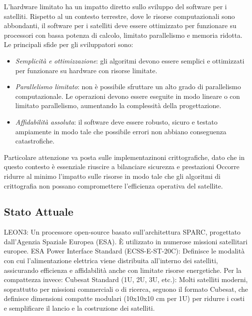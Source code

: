 \noindent
L'hardware limitato ha un impatto diretto sullo sviluppo del software per i satelliti. 
Rispetto al un contesto terrestre, dove le risorse computazionali sono abbondanti, il software per i satelliti deve essere ottimizzato per funzionare su processori con bassa potenza di calcolo, limitato parallelismo e memoria ridotta. 
Le principali sfide per gli sviluppatori sono:

\begin{itemize}
    \item \textit{Semplicità e ottimizzazione}: gli algoritmi devono essere semplici e ottimizzati per funzionare su hardware con risorse limitate.
    \item \textit{Parallelismo limitato}: non è possibile sfruttare un alto grado di parallelismo computazionale. Le operazioni devono essere eseguite in modo lineare o con limitato parallelismo, aumentando la complessità della progettazione.
    \item \textit{Affidabilità assoluta}: il software deve essere robusto, sicuro e testato ampiamente in modo tale che possibile errori non abbiano conseguenza catastrofiche.
\end{itemize}

\noindent
Particolare attenzione va posta sulle implementazinoni crittografiche, dato che in questo contesto è essenziale riuscire a bilanciare sicurezza e prestazioni
Occorre ridurre al minimo l'impatto sulle risorse in modo tale che gli algoritmi di crittografia non possano compromettere l'efficienza operativa del satellite.

\subsection{Stato Attuale}

LEON3: Un processore open-source basato sull'architettura SPARC, progettato dall'Agenzia Spaziale Europea (ESA). È utilizzato in numerose missioni satellitari europee.
ESA Power Interface Standard (ECSS-E-ST-20C): Definisce le modalità con cui l'alimentazione elettrica viene distribuita all'interno dei satelliti, assicurando efficienza e affidabilità anche con limitate risorse energetiche.
Per la compattezza invece: Cubesat Standard (1U, 2U, 3U, etc.): Molti satelliti moderni, soprattutto per missioni commerciali o di ricerca, seguono il formato Cubesat, che definisce dimensioni compatte modulari (10x10x10 cm per 1U) per ridurre i costi e semplificare il lancio e la costruzione dei satelliti.

